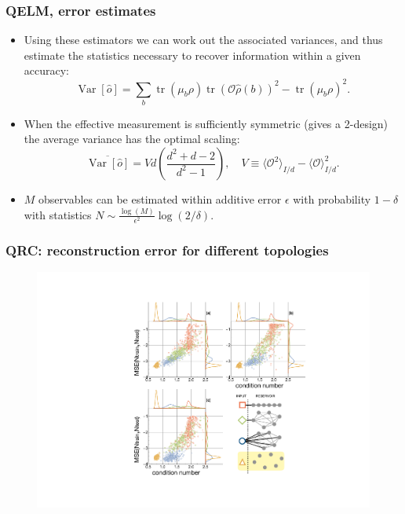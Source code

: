 \documentclass{beamer}
\begin{document}
\begin{frame}
\frametitle{QELM, error estimates}
    \begin{itemize}
        \item Using these estimators we can work out the associated variances, and thus estimate the statistics necessary to recover information within a given accuracy:
        \begin{equation}
            \operatorname{Var}[\hat o] =
            \sum_b\operatorname{tr}(\mu_b \rho) \operatorname{tr}(\mathcal O\hat\rho(b))^2 - \operatorname{tr}(\mu_b \rho)^2.
        \end{equation}
        \item When the effective measurement is sufficiently symmetric (gives a 2-design) the average variance has the optimal scaling:
        \begin{equation}
            \overline{\operatorname{Var}[\hat o]} =
            Vd \left(\frac{d^2+d-2}{d^2-1}\right),
            \quad
            V\equiv \langle\mathcal O^2\rangle_{I/d}-\langle\mathcal O\rangle_{I/d}^2.
        \end{equation}
        \item $M$ observables can be estimated within additive error $\epsilon$ with probability $1-\delta$ with statistics $N\sim \frac{\log(M)}{\epsilon^2}\log(2/\delta)$.
    \end{itemize}
\end{frame}



\begin{frame}
\frametitle{QRC: reconstruction error for different topologies}

\begin{figure}
\includegraphics[width=0.6\linewidth]{figures/figure04.pdf}
\end{figure}

\end{frame}
\end{document}
